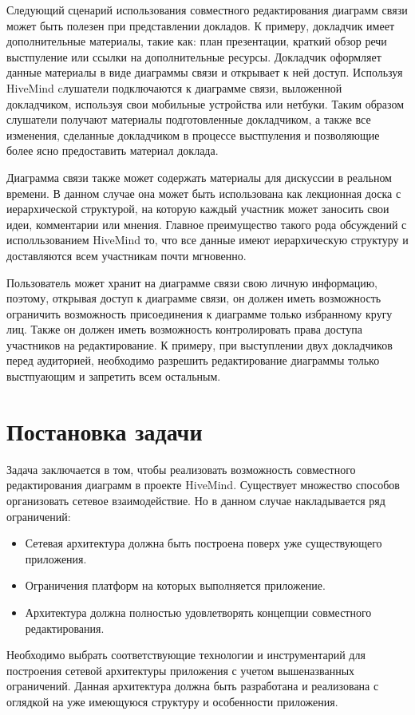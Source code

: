 Следующий сценарий использования совместного редактирования диаграмм связи может
быть полезен при представлении докладов. К примеру, докладчик имеет
дополнительные материалы, такие как: план презентации, краткий обзор речи
выстпуление или ссылки на дополнительные ресурсы. Докладчик оформляет данные
материалы в виде диаграммы связи и открывает к ней доступ. Используя HiveMind
cлушатели подключаются к диаграмме связи, выложенной докладчиком, используя свои
мобильные устройства или нетбуки. Таким образом слушатели получают материалы
подготовленные докладчиком, а также все изменения, сделанные докладчиком в
процессе выстпуления и позволяющие более ясно предоставить материал доклада.

Диаграмма связи также может содержать материалы для дискуссии в реальном
времени. В данном случае она может быть использована как лекционная доска с
иерархической структурой, на которую каждый участник может заносить свои идеи,
комментарии или мнения. Главное преимущество такого рода обсуждений с
исполльзованием HiveMind то, что все данные имеют иерархическую структуру и
доставляются всем участникам почти мгновенно.

Пользователь может хранит на диаграмме связи свою личную информацию, поэтому,
открывая доступ к диаграмме связи, он должен иметь возможность ограничить
возможность присоединения к диаграмме только избранному кругу лиц. Также он
должен иметь возможность контролировать права доступа участников на
редактирование. К примеру, при выступлении двух докладчиков перед аудиторией,
необходимо разрешить редактирование диаграммы только выстпуающим и
запретить всем остальным.


\section{Постановка задачи}
\label{sec:problem_statement}
Задача заключается в том, чтобы реализовать возможность совместного
редактирования диаграмм в проекте HiveMind. Существует множество способов
организовать сетевое взаимодействие. Но в данном случае накладывается ряд
ограничений:

\begin{itemize}
\item Сетевая архитектура должна быть построена поверх уже существующего
приложения.
\item Ограничения платформ на которых выполняется приложение.
\item Архитектура должна полностью удовлетворять концепции совместного
редактирования.
\end{itemize}

Необходимо выбрать соответствующие технологии и инструментарий для построения
сетевой архитектуры приложения с учетом вышеназванных ограничений. Данная
архитектура должна быть разработана и реализована с оглядкой на уже имеющуюся
структуру и особенности приложения.
